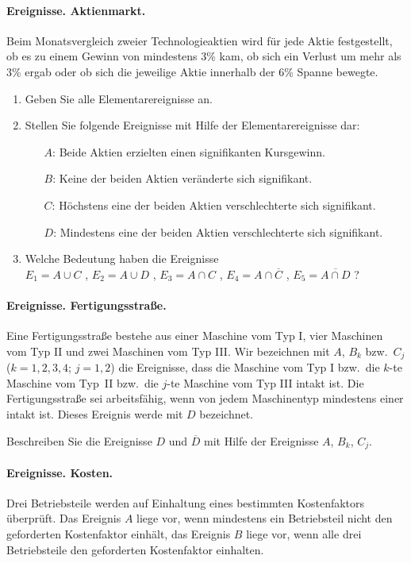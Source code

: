 \paragraph{Ereignisse. Aktienmarkt.}
Beim Monatsvergleich zweier Technologieaktien wird für jede Aktie
festgestellt, ob es zu einem Gewinn von mindestens 3\% kam, ob sich ein Verlust
um mehr als 3\% ergab oder ob sich die jeweilige Aktie innerhalb der 6\% Spanne
bewegte.
\begin{enumerate}
\item Geben Sie alle Elementarereignisse an.
\item Stellen Sie folgende Ereignisse mit Hilfe der Elementarereignisse
dar:
\begin{itemize}
\item[$A$:] Beide Aktien erzielten einen signifikanten Kursgewinn.
\item[$B$:] Keine der beiden Aktien veränderte sich signifikant.
\item[$C$:] Höchstens eine der beiden Aktien verschlechterte sich
signifikant.
\item[$D$:] Mindestens eine der beiden Aktien verschlechterte sich
signifikant.
\end{itemize}
\item Welche Bedeutung haben die Ereignisse\\
$E_1=A\cup C$ , $E_2=A\cup D$ , $E_3=A\cap C$ , $E_4=A\cap\overline{C}$ , $E_5=
\overline{A\cap D}$ ?
\end{enumerate}


\paragraph{Ereignisse. Fertigungsstraße.}
Eine Fertigungsstraße bestehe  aus einer Maschine vom Typ I, vier Maschinen vom
Typ II und zwei Maschinen vom Typ III. Wir bezeichnen mit $A$, $B_k$ bzw.\
$C_j$ ($k=1,2,3,4$; $j=1,2$) die Ereignisse, dass die Maschine vom Typ I
bzw.~die $k$-te Maschine vom Typ~II bzw.~die $j$-te Maschine vom Typ III intakt
ist. Die Fertigungsstraße sei arbeitsfähig, wenn von jedem Maschinentyp
mindestens einer intakt ist. Dieses Ereignis werde mit $D$ bezeichnet.

Beschreiben Sie die Ereignisse $D$ und $\overline{D}$ mit Hilfe der Ereignisse
$A$, $B_k$, $C_j$.


\paragraph{Ereignisse. Kosten.}
Drei Betriebsteile werden auf Einhaltung eines bestimmten
Kostenfaktors überprüft. Das Ereignis $A$ liege vor, wenn mindestens ein
Betriebsteil nicht den geforderten Kostenfaktor einhält, das Ereignis $B$ liege
vor, wenn alle drei Betriebsteile den geforderten Kostenfaktor einhalten.

